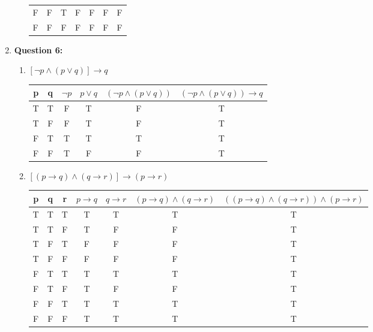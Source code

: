 \documentclass[11pt]{article}
\begin{document}
\begin{enumerate}
\begin{enumerate}[label=(\alph*)]
\begin{center}
\begin{tabular}{|c|c|c|c|c|c|c|}
            F & F & T & F & F & F & F \\
            F & F & F & F & F & F & F \\
            \hline
        \end{tabular}
    \end{center}
\end{enumerate}
\item \textbf{Question 6:}
\begin{enumerate}[label=(\alph*)]
    \item $[\lnot p \land (p \lor q)] \rightarrow q$
    \begin{center}
        \begin{tabular}{|c|c|c|c|c|c|}
            \hline
             p & q & $\lnot p$ & $p\lor q$ & $(\lnot p\land(p\lor q))$ & $(\lnot p\land(p\lor q))\rightarrow q$ \\
            \hline
             T & T & F & T & F & T \\
             T & F & F & T & F & T \\
             F & T & T & T & T & T \\
             F & F & T & F & F & T \\
            \hline
        \end{tabular}
    \end{center}
    \item $[(p \rightarrow q) \land (q \rightarrow r)] \rightarrow (p \rightarrow r)$
    \begin{center}
        \begin{tabular}{|c|c|c|c|c|c|c|}
            \hline
             p & q & r & $p\rightarrow q$ & $q\rightarrow r$ & $(p\rightarrow q)\land(q\rightarrow r)$ & $((p\rightarrow q)\land(q\rightarrow r))\land(p\rightarrow r)$ \\
            \hline
             T & T & T & T & T & T & T \\
             T & T & F & T & F & F & T \\
             T & F & T & F & F & F & T \\
             T & F & F & F & F & F & T \\
             F & T & T & T & T & T & T \\
             F & T & F & T & F & F & T \\
             F & F & T & T & T & T & T \\
             F & F & F & T & T & T & T \\
            \hline
        \end{tabular}

\end{center}
\end{enumerate}
\end{enumerate}
\end{document}
